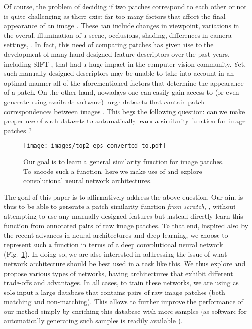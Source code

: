 \documentclass[10pt,twocolumn,letterpaper]{article}
\newcommand*{\USEIMAGES}{}
\begin{document}
Of course, the problem of deciding if two patches correspond to each other or not is  quite challenging  as there exist far too many factors that affect the final appearance of an image \cite{nowak:hal-00203958}. These can include changes in viewpoint, variations in the overall illumination of a scene, occlusions, shading, differences in camera settings, \etc.
In fact, this need of comparing patches has given rise to the development of many hand-designed feature descriptors over the past years, including SIFT \cite{LoweSift}, that had a huge impact in the computer vision community.
Yet, such manually designed descriptors may be unable
to take into account in an optimal manner all of the aforementioned factors that determine the appearance of a patch. On the other hand, nowadays one can easily gain access to (or even generate using available software) large datasets that contain  patch correspondences between images      \cite{photo_collections}.
 This begs the following question: can we make proper use of such datasets to automatically
learn a similarity function for image patches ?

\ifdefined\USEIMAGES
\begin{figure}
\small
\begin{center}
\texttt{[image: images/top2-eps-converted-to.pdf]}
\end{center}
\vspace{-7pt}
\caption{Our goal is to learn a  general similarity function for image patches. To encode such a function, here we make use of   and explore convolutional neural network architectures.}
\label{fig:intro}
\small
\vspace{-13pt}
\end{figure}
\fi

The goal of this paper is to affirmatively address the above question. Our aim is thus to be able to generate a patch similarity function \emph{from scratch}, \ie, without attempting to use any manually designed features but instead directly learn this function from annotated pairs of  raw image patches. To that end, inspired also by the recent advances in  neural architectures and  deep learning, we choose to represent such a function in terms of a deep convolutional neural network \cite{lecun-88, kriz2012} (Fig.~\ref{fig:intro}). In doing so, we are also interested in addressing the  issue of what   network architecture should  be best used in a task like this. We thus explore and propose various types of networks, having  architectures that  exhibit different trade-offs and advantages.
 In all  cases, to train these networks, we are using as  sole input a large database  that contains pairs of raw image patches (both matching and
non-matching).
This  allows to further improve the performance of our method  simply by enriching this database with more samples 
%
(as  software for automatically generating such samples is readily available  \cite{photo_tourism}).
\end{document}
